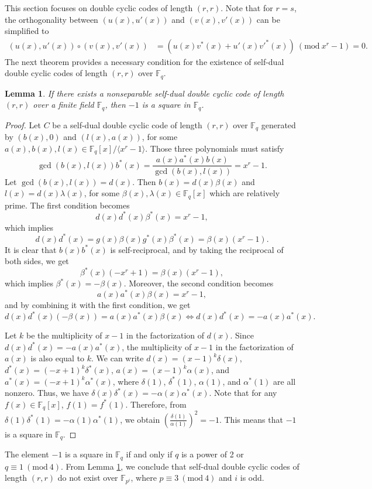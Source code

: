 \documentclass[12pt]{article}
\newtheorem{lemma}[theorem]{Lemma}
\newcommand{\Mod}[1]{\ (\mathrm{mod}\ #1)}
\begin{document}
	This section focuses on double cyclic codes of length $(r,r)$. Note that for $r=s$, the orthogonality between $(u(x),u'(x))$ and $(v(x),v'(x))$ can be simplified to
	\begin{align*}
		(u(x),u'(x))\circ (v(x),v'(x))&
		=(u(x)v^{*}(x)+u'(x)v'^{*}(x))\Mod{x^r-1}=0.
	\end{align*}
	The next theorem provides a necessary condition for the existence of self-dual double cyclic codes of length $(r,r)$ over $\mathbb{F}_q$.
	\begin{lemma}\label{sddcc}
		If there exists a nonseparable self-dual double cyclic code of length $(r,r)$ over a finite field $\mathbb{F}_q$, then $-1$ is a square in $\mathbb{F}_q$.
	\end{lemma}
	\begin{proof}
		Let $C$ be a self-dual double cyclic code of length $(r,r)$ over $\mathbb{F}_q$ generated by $(b(x),0)$ and $(l(x),a(x))$, for some $a(x),b(x),l(x)\in\mathbb{F}_q[x]/\langle x^r-1\rangle$. Those three polynomials must satisfy $$\gcd(b(x),l(x)) b^{*}(x) = \frac{a(x)a^{*}(x)b(x)}{\gcd(b(x),l(x))}=x^{r}-1.$$
		Let $\gcd(b(x),l(x))=d(x)$. Then $b(x)=d(x)\beta(x)$ and $l(x)=d(x)\lambda(x)$, for some $\beta(x),\lambda(x)\in\mathbb{F}_q[x]$ which are relatively prime. The first condition becomes $$d(x) d^{*}(x)\beta^{*}(x) = x^r-1,$$ which implies $$d(x)d^{*}(x)=g(x)\beta(x)g^{*}(x)\beta^{*}(x)=\beta(x)(x^r-1).$$
		It is clear that $b(x)b^{*}(x)$ is self-reciprocal, and by taking the reciprocal of both sides, we get $$\beta^{*}(x)(-x^r+1)=\beta(x)(x^r-1),$$ which implies $\beta^{*}(x)=-\beta(x)$. Moreover, the second condition becomes $$a(x)a^{*}(x)\beta(x)=x^r-1,$$ and by combining it with the first condition, we get $$d(x)d^{*}(x)(-\beta(x))=a(x)a^{*}(x)\beta(x)\Leftrightarrow d(x) d^{*}(x)=-a(x)a^{*}(x).$$
		
		Let $k$ be the multiplicity of $x-1$ in the factorization of $d(x)$. Since $d(x) d^{*}(x)=-a(x)a^{*}(x)$, the multiplicity of $x-1$ in the factorization of $a(x)$ is also equal to $k$. We can write $d(x)=(x-1)^k \delta(x)$, $d^{*}(x)=(-x+1)^k\delta^{*}(x)$, $a(x)=(x-1)^k\alpha(x)$, and $a^{*}(x)=(-x+1)^k\alpha^{*}(x)$, where $\delta(1)$, $\delta^{*}(1)$, $\alpha(1)$, and $\alpha^{*}(1)$ are all nonzero. Thus, we have $\delta(x)\delta^{*}(x)=-\alpha(x)\alpha^{*}(x)$. Note that for any $f(x)\in\mathbb{F}_q[x]$, $f(1)=f^{*}(1)$. Therefore, from $\delta(1)\delta^{*}(1)=-\alpha(1)\alpha^{*}(1)$, we obtain $\left(\frac{\delta(1)}{\alpha(1)}\right)^2=-1$.
		This means that $-1$ is a square in $\mathbb{F}_q$.
	\end{proof}
	The element $-1$ is a square in $\mathbb{F}_q$ if and only if $q$ is a power of 2 or $q\equiv 1\Mod{4}$. From Lemma \ref{sddcc}, we conclude that self-dual double cyclic codes of length $(r,r)$ do not exist over $\mathbb{F}_{p^i}$, where $p\equiv 3\Mod{4}$ and $i$ is odd.
	
\end{document}
